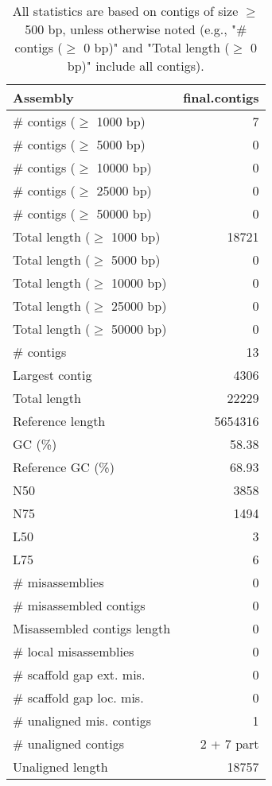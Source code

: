 \documentclass[12pt,a4paper]{article}
\begin{document}
\begin{table}[ht]
\begin{center}
\caption{All statistics are based on contigs of size $\geq$ 500 bp, unless otherwise noted (e.g., "\# contigs ($\geq$ 0 bp)" and "Total length ($\geq$ 0 bp)" include all contigs).}
\begin{tabular}{|l*{1}{|r}|}
\hline
Assembly & final.contigs \\ \hline
\# contigs ($\geq$ 1000 bp) & 7 \\ \hline
\# contigs ($\geq$ 5000 bp) & 0 \\ \hline
\# contigs ($\geq$ 10000 bp) & 0 \\ \hline
\# contigs ($\geq$ 25000 bp) & 0 \\ \hline
\# contigs ($\geq$ 50000 bp) & 0 \\ \hline
Total length ($\geq$ 1000 bp) & 18721 \\ \hline
Total length ($\geq$ 5000 bp) & 0 \\ \hline
Total length ($\geq$ 10000 bp) & 0 \\ \hline
Total length ($\geq$ 25000 bp) & 0 \\ \hline
Total length ($\geq$ 50000 bp) & 0 \\ \hline
\# contigs & 13 \\ \hline
Largest contig & 4306 \\ \hline
Total length & 22229 \\ \hline
Reference length & 5654316 \\ \hline
GC (\%) & 58.38 \\ \hline
Reference GC (\%) & 68.93 \\ \hline
N50 & 3858 \\ \hline
N75 & 1494 \\ \hline
L50 & 3 \\ \hline
L75 & 6 \\ \hline
\# misassemblies & 0 \\ \hline
\# misassembled contigs & 0 \\ \hline
Misassembled contigs length & 0 \\ \hline
\# local misassemblies & 0 \\ \hline
\# scaffold gap ext. mis. & 0 \\ \hline
\# scaffold gap loc. mis. & 0 \\ \hline
\# unaligned mis. contigs & 1 \\ \hline
\# unaligned contigs & 2 + 7 part \\ \hline
Unaligned length & 18757 \\ \hline

\end{tabular}
\end{center}
\end{table}
\end{document}
